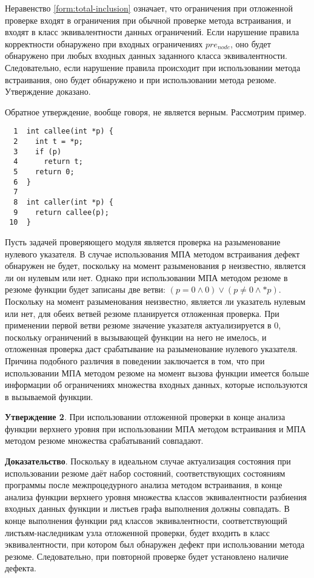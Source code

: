 Неравенство \ref{form:total-inclusion} означает, что ограничения при отложенной проверке входят в ограничения при обычной проверке метода встраивания, и входят в класс эквивалентности данных ограничений. Если нарушение правила корректности обнаружено при входных ограничениях $pre_{node}$, оно будет обнаружено при любых входных данных заданного класса эквивалентности. Следовательно, если нарушение правила происходит при использовании метода встраивания, оно будет обнаружено и при использовании метода резюме. Утверждение доказано.

Обратное утверждение, вообще говоря, не является верным. Рассмотрим пример.

\begin{verbatim}
  1  int callee(int *p) {
  2    int t = *p;
  3    if (p)
  4      return t;
  5    return 0;
  6  }
  7
  8  int caller(int *p) {
  9    return callee(p);
 10  }
\end{verbatim}

Пусть задачей проверяющего модуля является проверка на разыменование нулевого указателя. В случае использования МПА методом встраивания дефект обнаружен не будет, поскольку на момент разыменования \texttt{p} неизвестно, является ли он нулевым или нет. Однако при использовании МПА методом резюме в резюме функции будет записаны две ветви: $(p = 0 \wedge 0) \vee (p \neq 0 \wedge *p)$. Поскольку на момент разыменования неизвестно, является ли указатель нулевым или нет, для обеих ветвей резюме планируется отложенная проверка. При применении первой ветви резюме значение указателя актуализируется в 0, поскольку ограничений в вызывающей функции на него не имелось, и отложенная проверка даст срабатывание на разыменование нулевого указателя. Причина подобного различия в поведении заключается в том, что при использовании МПА методом резюме на момент вызова функции имеется больше информации об ограничениях множества входных данных, которые используются в вызываемой функции.

\textbf{Утверждение 2}. При использовании отложенной проверки в конце анализа функции верхнего уровня при использовании МПА методом встраивания и МПА методом резюме множества срабатываний совпадают.

\textbf{Доказательство}. Поскольку в идеальном случае актуализация состояния при использовании резюме даёт набор состояний, соответствующих состояниям программы после межпроцедурного анализа методом встраивания, в конце анализа функции верхнего уровня множества классов эквивалентности разбиения входных данных функции и листьев графа выполнения должны совпадать. В конце выполнения функции ряд классов эквивалентности, соответствующий листьям-наследникам узла отложенной проверки, будет входить в класс эквивалентности, при котором был обнаружен дефект при использовании метода резюме. Следовательно, при повторной проверке будет установлено наличие дефекта.

